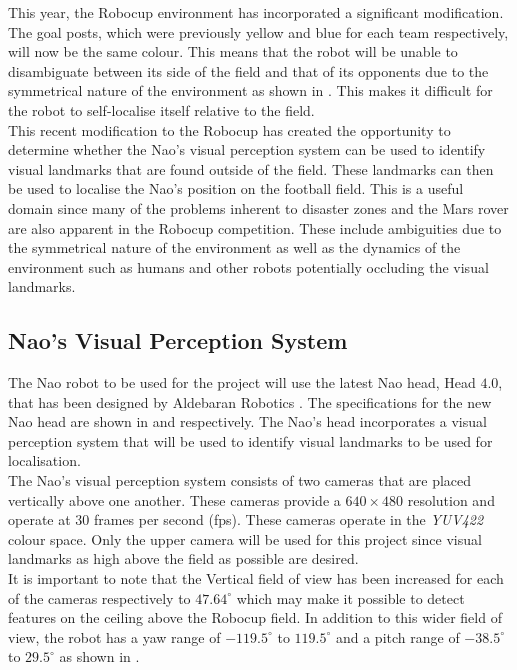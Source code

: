 \documentclass{report}
\begin{document}
This year, the Robocup environment has incorporated a significant modification. The goal posts, which were previously yellow and blue for each team respectively, will now be the same colour. This means that the robot will be unable to disambiguate between its side of the field and that of its opponents due to the symmetrical nature of the environment as shown in . This makes it difficult for the robot to self-localise itself relative to the field.\\

This recent modification to the Robocup has created the opportunity to determine whether the Nao's visual perception system can be used to identify visual landmarks that are found outside of the field. These landmarks can then be used to localise the Nao's position on the football field. This is a useful domain since many of the problems inherent to disaster zones and the Mars rover are also apparent in the Robocup competition. These include ambiguities due to the symmetrical nature of the environment as well as the dynamics of the environment such as humans and other robots potentially occluding the visual landmarks.\\

\subsection{Nao's Visual Perception System}
\label{sec:naoSpecs}
The Nao robot to be used for the project will use the latest Nao head, Head $4.0$, that has been designed by Aldebaran Robotics \cite{NaoHead}. The specifications for the new Nao head are shown in  and  respectively. The Nao's head incorporates a visual perception system that will be used to identify visual landmarks to be used for localisation.\\

The Nao's visual perception system consists of two cameras that are placed vertically above one another. These cameras provide a $640 \times 480$ resolution and operate at $30$ frames per second (fps). These cameras operate in the \textit{YUV422} colour space. Only the upper camera will be used for this project since visual landmarks as high above the field as possible are desired.\\

It is important to note that the Vertical field of view has been increased for each of the cameras respectively to $47.64^\circ$ which may make it possible to detect features on the ceiling above the Robocup field. In addition to this wider field of view, the robot has a yaw range of $-119.5^\circ$ to $119.5^\circ$ and a pitch range of $-38.5^\circ$ to $29.5^\circ$ as shown in .\\ 
\end{document}
